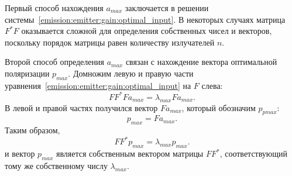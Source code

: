 Первый способ нахождения $a_{max}$ заключается в решении системы~\eqref{emission:emitter:gain:optimal_input}. В некоторых случаях матрица
$F^*F$ оказывается сложной для определения собственных чисел и векторов, поскольку порядок матрицы равен количеству излучателей $n$.

Второй способ определения $a_{max}$ связан с нахождение вектора оптимальной поляризации $p_{max}$. Домножим левую и правую части
уравнения~\eqref{emission:emitter:gain:optimal_input} на $F$ слева:
\[
    F F^* F a_{max} = \lambda_{max} F a_{max} .
\]
В левой и правой частях получился вектор $F a_{max}$, который обозначим $p_{pmax}$:
\[
    p_{max} = F a_{max} .
\]
Таким образом,
\[
    F F^* p_{max} = \lambda_{max} p_{max} .
\]
и вектор $p_{max}$ является собственным вектором матрицы $F F^*$, соответствующий тому же собственному числу $\lambda_{max}$.

